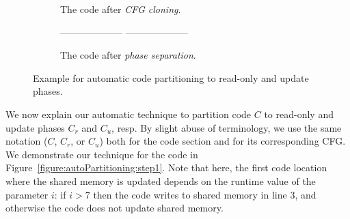 \begin{figure*}
\begin{center}
\begin{subfigure}[t]{.3\textwidth}
\begin{algorithmic}[0]{}
{            \State\hspace{-3mm}{6':\ return temp}
			\EndFunction
			}
		\end{algorithmic}
		\caption{The code after \emph{CFG cloning}.}
 \label{figure:autoPartitioning:step2}
	\end{subfigure}
	\begin{subfigure}[t]{.35\textwidth}
		\begin{algorithmic}[0]{}
		{\ttfamily
			 \label{codeXXX:aaaaa}
            \Statex -------------------- 
            \State\hspace{-3mm}{1 :\ x.lock()}
            \State\hspace{-3mm}{2 :\ if i>7  then}
            \State{}
            \State\hspace{-3mm}{4 :\ temp = x.f1 + x.f2}
            \State\hspace{-3mm}{5 :\ x.unlock()}
            \State{}
            \Statex -------------------- 
            \State\hspace{-3mm}{1':\ x.lock()}
            \State\hspace{-3mm}{2':\ if x.f1>i  then}
            \State\hspace{-3mm}{3':\ \ \ x.f2 = i}
            \State\hspace{-3mm}{4':\ temp = x.f1 + x.f2}
            \State\hspace{-3mm}{5':\ x.unlock()}
            \State\hspace{-3mm}{6':\ return temp}
			\EndFunction
			}
		\end{algorithmic}
		\caption{The code after \emph{phase separation}.
} \label{figure:autoPartitioning:step3}
	\end{subfigure}

	\end{center}
\vspace{-4mm}
	\caption{Example for automatic code partitioning to read-only and update phases.}
			\label{figure:autoPartitioning}
\end{figure*}

We now explain our automatic technique to partition code $C$ to read-only and update phases $C_r$ and $C_u$, resp.
By slight abuse of terminology, we use the same notation ($C$, $C_r$, or $C_u$) both for the code section and
for its corresponding CFG.
%
We demonstrate our technique for the code in Figure~\ref{figure:autoPartitioning:step1}.
Note that here, the first code location where the shared memory is updated depends on the runtime value of the parameter $i$: if $i>7$ then the code writes to shared memory in line $3$, and otherwise the code does not update shared memory.

